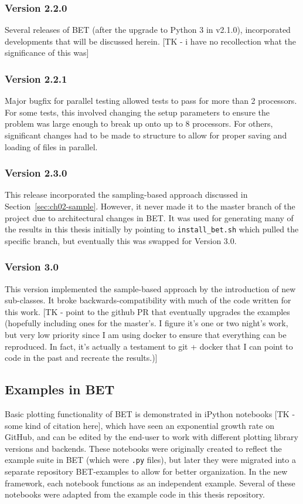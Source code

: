 \subsubsection{Version 2.2.0}
Several releases of BET (after the upgrade to Python 3 in v2.1.0), incorporated developments that will be discussed herein.
[TK - i have no recollection what the significance of this was]

\subsubsection{Version 2.2.1}
Major bugfix for parallel testing allowed tests to pass for more than 2 processors.
For some tests, this involved changing the setup parameters to ensure the problem was large enough to break up onto up to 8 processors.
For others, significant changes had to be made to structure to allow for proper saving and loading of files in parallel.


\subsubsection{Version 2.3.0}
This release incorporated the sampling-based approach discussed in Section~\ref{sec:ch02-sample}.
However, it never made it to the master branch of the project due to architectural changes in BET.
It was used for generating many of the results in this thesis initially by pointing to {\tt install\_bet.sh} which pulled the specific branch, but eventually this was swapped for Version 3.0.

\subsubsection{Version 3.0}
This version implemented the sample-based approach by the introduction of new sub-classes.
It broke backwards-compatibility with much of the code written for this work.
[TK - point to the github PR that eventually upgrades the examples (hopefully including ones for the master's. I figure it's one or two night's work, but very low priority since I am using docker to ensure that everything can be reproduced. In fact, it's actually a testament to git + docker that I can point to code in the past and recreate the results.)]

\subsection{Examples in BET}
Basic plotting functionality of BET is demonstrated in iPython notebooks [TK - some kind of citation here], which have seen an exponential growth rate on GitHub, and can be edited by the end-user to work with different plotting library versions and backends.
These notebooks were originally created to reflect the example suite in BET (which were {\tt .py} files), but later they were migrated into a separate repository BET-examples to allow for better organization.
In the new framework, each notebook functions as an independent example.
Several of these notebooks were adapted from the example code in this thesis repository.
